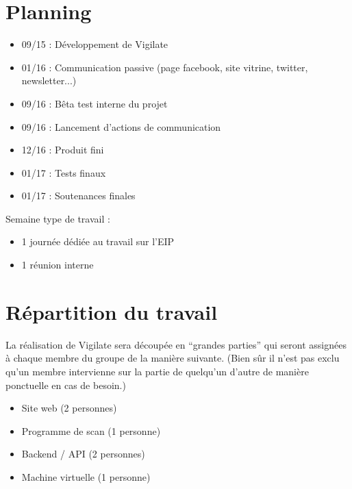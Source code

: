 \section{Planning}
\begin{itemize}
\item 09/15 : Développement de Vigilate\\
\item 01/16 : Communication passive (page facebook, site vitrine, twitter, newsletter...)\\
\item 09/16 : Bêta test interne du projet\\
\item 09/16 : Lancement d’actions de communication\\
\item 12/16 : Produit fini\\
\item 01/17 : Tests finaux\\
\item 01/17 : Soutenances finales\\
\end{itemize}


Semaine type de travail :\\
\begin{itemize}
\item 1 journée dédiée au travail sur l’EIP\\
\item 1 réunion interne\\
\end{itemize}

\section{Répartition du travail}
La réalisation de Vigilate sera découpée en “grandes parties” qui seront assignées à chaque membre du groupe de la manière suivante. (Bien sûr il n’est pas exclu qu’un membre intervienne sur la partie de quelqu’un d’autre de manière ponctuelle en cas de besoin.)\\
\begin{itemize}
\item Site web (2 personnes)\\
\item Programme de scan (1 personne)\\
\item Backend / API (2 personnes)\\
\item Machine virtuelle (1 personne)\\
\end{itemize}